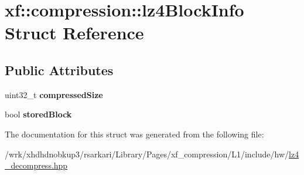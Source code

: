 \hypertarget{structxf_1_1compression_1_1lz4BlockInfo}{\section{xf\-:\-:compression\-:\-:lz4\-Block\-Info Struct Reference}
\label{structxf_1_1compression_1_1lz4BlockInfo}
}
\subsection*{Public Attributes}
\begin{DoxyCompactItemize}
\item 
\hypertarget{structxf_1_1compression_1_1lz4BlockInfo_afc520ad8a6b4a9434287649dd1483082}{uint32\-\_\-t {\bfseries compressed\-Size}}\label{structxf_1_1compression_1_1lz4BlockInfo_afc520ad8a6b4a9434287649dd1483082}

\item 
\hypertarget{structxf_1_1compression_1_1lz4BlockInfo_ae4eeb5bf41943f51a3db3e2bf569d742}{bool {\bfseries stored\-Block}}\label{structxf_1_1compression_1_1lz4BlockInfo_ae4eeb5bf41943f51a3db3e2bf569d742}

\end{DoxyCompactItemize}


The documentation for this struct was generated from the following file\-:\begin{DoxyCompactItemize}
\item 
/wrk/xhdhdnobkup3/rsarkari/\-Library/\-Pages/xf\-\_\-compression/\-L1/include/hw/\hyperlink{lz4__decompress_8hpp}{lz4\-\_\-decompress.\-hpp}\end{DoxyCompactItemize}
